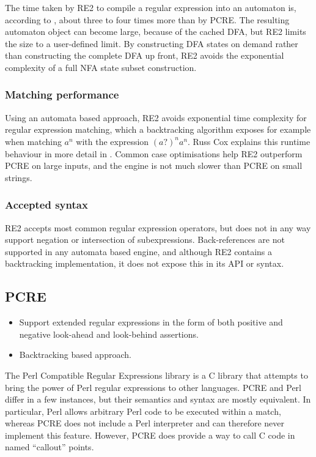 The time taken by RE2 to compile a regular expression into an automaton is,
according to \cite{regexp3}, about three to four times more than by PCRE. The
resulting automaton object can become large, because of the cached DFA, but RE2
limits the size to a user-defined limit. By constructing DFA states on demand
rather than constructing the complete DFA up front, RE2 avoids the exponential
complexity of a full NFA state subset construction.


\subsubsection{Matching performance}

Using an automata based approach, RE2 avoids exponential time complexity for
regular expression matching, which a backtracking algorithm exposes for example
when matching $a^n$ with the expression $(a?)^na^n$. Russ Cox explains this
runtime behaviour in more detail in \cite{regexp1}. Common case optimisations
help RE2 outperform PCRE on large inputs, and the engine is not much slower than
PCRE on small strings.


\subsubsection{Accepted syntax}

RE2 accepts most common regular expression operators, but does not in any way
support negation or intersection of subexpressions. Back-references are not
supported in any automata based engine, and although RE2 contains a backtracking
implementation, it does not expose this in its API or syntax.


\subsection{PCRE}

\begin{itemize}

   \item Support extended regular expressions in the form of both positive and
      negative look-ahead and look-behind assertions.

   \item Backtracking based approach.

\end{itemize}


The Perl Compatible Regular Expressions library is a C library that attempts to
bring the power of Perl regular expressions to other languages. PCRE and Perl
differ in a few instances, but their semantics and syntax are mostly equivalent.
In particular, Perl allows arbitrary Perl code to be executed within a match,
whereas PCRE does not include a Perl interpreter and can therefore never
implement this feature. However, PCRE does provide a way to call C code in named
``callout'' points.

